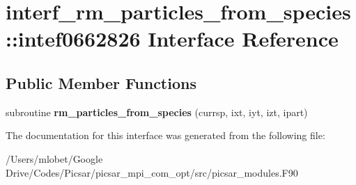 \hypertarget{interfaceinterf__rm__particles__from__species_1_1intef0662826}{}\section{interf\+\_\+rm\+\_\+particles\+\_\+from\+\_\+species\+:\+:intef0662826 Interface Reference}
\label{interfaceinterf__rm__particles__from__species_1_1intef0662826}
\subsection*{Public Member Functions}
\begin{DoxyCompactItemize}
\item 
subroutine {\bfseries rm\+\_\+particles\+\_\+from\+\_\+species} (currsp, ixt, iyt, izt, ipart)\hypertarget{interfaceinterf__rm__particles__from__species_1_1intef0662826_a6ef7f9aa506b0d43c5a54485e819f604}{}\label{interfaceinterf__rm__particles__from__species_1_1intef0662826_a6ef7f9aa506b0d43c5a54485e819f604}

\end{DoxyCompactItemize}


The documentation for this interface was generated from the following file\+:\begin{DoxyCompactItemize}
\item 
/\+Users/mlobet/\+Google Drive/\+Codes/\+Picsar/picsar\+\_\+mpi\+\_\+com\+\_\+opt/src/picsar\+\_\+modules.\+F90\end{DoxyCompactItemize}
